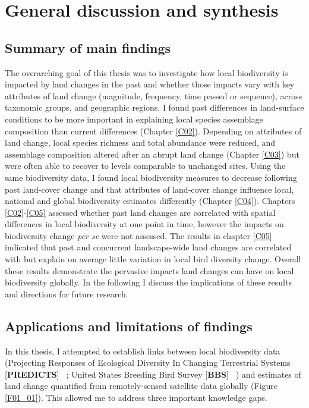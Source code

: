 \chapter{General discussion and synthesis}
\label{C06}

\section{Summary of main findings}
\label{C06_01}

The overarching goal of this thesis was to investigate how local biodiversity is impacted by land changes in the past and whether those impacts vary with key attributes of land change (\eg magnitude, frequency, time passed or sequence), across taxonomic groups, and geographic regions. I found past differences in land-surface conditions to be more important in explaining local species assemblage composition than current differences (Chapter \ref{C02}). Depending on attributes of land change, local species richness and total abundance were reduced, and assemblage composition altered after an abrupt land change (Chapter \ref{C03}) but were often able to recover to levels comparable to unchanged sites. Using the same biodiversity data, I found local biodiversity measures to decrease following past land-cover change and that attributes of land-cover change influence local, national and global biodiversity estimates differently (Chapter \ref{C04}). Chapters \ref{C02}-\ref{C05} assessed whether past land changes are correlated with spatial differences in local biodiversity at one point in time, however the impacts on biodiversity change \textit{per se} were not assessed. The results in chapter \ref{C05} indicated that past and concurrent landscape-wide land changes are correlated with but explain on average little variation in local bird diversity change. Overall these results demonstrate the pervasive impacts land changes can have on local biodiversity globally. In the following I discuss the implications of these results and directions for future research.

\section{Applications and limitations of findings}
\label{C06_02}

In this thesis, I attempted to establish links between local biodiversity data (Projecting Responses of Ecological Diversity In Changing Terrestrial Systems [\textbf{PREDICTS}] \textendash\ \cite{Hudson2016}; United States Breeding Bird Survey [\textbf{BBS}] \textendash\ \cite{Pardieck2018}) and estimates of land change quantified from remotely-sensed satellite data globally (Figure \ref{F01_01}). This allowed me to address three important knowledge gaps.

